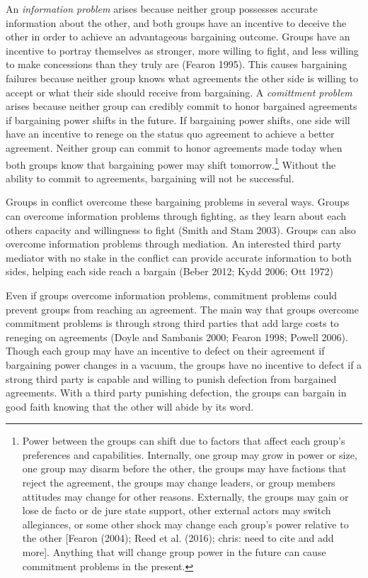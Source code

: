 \documentclass[11pt]{article}
\begin{document}
An \emph{information problem} arises because neither group possesses
accurate information about the other, and both groups have an incentive
to deceive the other in order to achieve an advantageous bargaining
outcome. Groups have an incentive to portray themselves as stronger,
more willing to fight, and less willing to make concessions than they
truly are (Fearon 1995). This causes bargaining failures because neither
group knows what agreements the other side is willing to accept or what
their side should receive from bargaining. A \emph{comittment problem}
arises because neither group can credibly commit to honor bargained
agreements if bargaining power shifts in the future. If bargaining power
shifts, one side will have an incentive to renege on the status quo
agreement to achieve a better agreement. Neither group can commit to
honor agreements made today when both groups know that bargaining power
may shift tomorrow.\footnote{Power between the groups can shift due to
  factors that affect each group's preferences and capabilities.
  Internally, one group may grow in power or size, one group may disarm
  before the other, the groups may have factions that reject the
  agreement, the groups may change leaders, or group members attitudes
  may change for other reasons. Externally, the groups may gain or lose
  de facto or de jure state support, other external actors may switch
  allegiances, or some other shock may change each group's power
  relative to the other {[}Fearon (2004); Reed et al. (2016); chris:
  need to cite and add more{]}. Anything that will change group power in
  the future can cause commitment problems in the present.} Without the
ability to commit to agreements, bargaining will not be successful.

Groups in conflict overcome these bargaining problems in several ways.
Groups can overcome information problems through fighting, as they learn
about each others capacity and willingness to fight (Smith and Stam
2003). Groups can also overcome information problems through mediation.
An interested third party mediator with no stake in the conflict can
provide accurate information to both sides, helping each side reach a
bargain (Beber 2012; Kydd 2006; Ott 1972)

Even if groups overcome information problems, commitment problems could
prevent groups from reaching an agreement. The main way that groups
overcome commitment problems is through strong third parties that add
large costs to reneging on agreements (Doyle and Sambanis 2000; Fearon
1998; Powell 2006). Though each group may have an incentive to defect on
their agreement if bargaining power changes in a vacuum, the groups have
no incentive to defect if a strong third party is capable and willing to
punish defection from bargained agreements. With a third party punishing
defection, the groups can bargain in good faith knowing that the other
will abide by its word.
\end{document}
